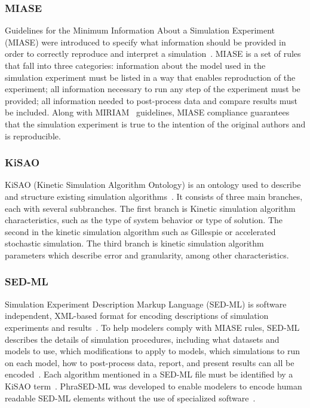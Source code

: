 \documentclass[12pt]{report}
\begin{document}
\subsubsection{MIASE}
Guidelines for the Minimum Information About a Simulation Experiment (MIASE) were introduced to specify what information should be provided in order to correctly reproduce and interpret a simulation~\cite{waltemath_minimum_2011}. MIASE is a set of rules that fall into three categories: information about the model used in the simulation experiment must be listed in a way that enables reproduction of the experiment; all information necessary to run any step of the experiment must be provided; all information needed to post-process data and compare results must be included.  Along with MIRIAM~\cite{novere_minimum_2005} guidelines, MIASE compliance guarantees that the simulation experiment is true to the intention of the original authors and is reproducible. 

\subsubsection{KiSAO}
KiSAO (Kinetic Simulation Algorithm Ontology) is an ontology used to describe and structure existing simulation algorithms~\cite{Zhukova2011, Curtout2011}. It consists of three main branches, each with several subbranches. The first branch is Kinetic simulation algorithm characteristics, such as the type of system behavior or type of solution. The second in the kinetic simulation algorithm such as Gillespie or accelerated stochastic simulation. The third branch is kinetic simulation algorithm parameters which describe error and granularity, among other characteristics. 

\subsubsection{SED-ML}
Simulation Experiment Description Markup Language (SED-ML) is software independent, XML-based format for encoding descriptions of simulation experiments and results~\cite{bergmann_simulation_2018, Smith2021simulation}. To help modelers comply with MIASE rules, SED-ML describes the details of simulation procedures, including what datasets and models to use, which modifications to apply to models, which simulations to run on each model, how to post-process data, report, and present results can all be encoded~\cite{waltemath_minimum_2011}. Each algorithm mentioned in a SED-ML file must be identified by a KiSAO term~\cite{Curtout2011}. PhraSED-ML was developed to enable modelers to encode human readable SED-ML elements without the use of specialized software~\cite{choi_phrased-ml_2016}.
\end{document}
